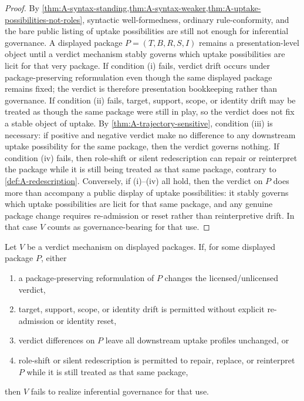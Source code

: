 \begin{proof}
By \cref{thm:A-syntax-standing,thm:A-syntax-weaker,thm:A-uptake-possibilities-not-roles}, syntactic well-formedness, ordinary rule-conformity, and the bare public listing of uptake possibilities are still not enough for inferential governance. A displayed package $P=(T,B,R,S,I)$ remains a presentation-level object until a verdict mechanism stably governs which uptake possibilities are licit for that very package. If condition (i) fails, verdict drift occurs under package-preserving reformulation even though the same displayed package remains fixed; the verdict is therefore presentation bookkeeping rather than governance. If condition (ii) fails, target, support, scope, or identity drift may be treated as though the same package were still in play, so the verdict does not fix a stable object of uptake. By \cref{thm:A-trajectory-sensitive}, condition (iii) is necessary: if positive and negative verdict make no difference to any downstream uptake possibility for the same package, then the verdict governs nothing. If condition (iv) fails, then role-shift or silent redescription can repair or reinterpret the package while it is still being treated as that same package, contrary to \cref{def:A-redescription}. Conversely, if (i)--(iv) all hold, then the verdict on $P$ does more than accompany a public display of uptake possibilities: it stably governs which uptake possibilities are licit for that same package, and any genuine package change requires re-admission or reset rather than reinterpretive drift. In that case $V$ counts as governance-bearing for that use.
\end{proof}


\begin{theorem}
\label{thm:A-drift-failure}
Let $V$ be a verdict mechanism on displayed packages. If, for some displayed package $P$, either
\begin{enumerate}[label=(\roman*), leftmargin=2.5em]
    \item a package-preserving reformulation of $P$ changes the licensed/unlicensed verdict,
    \item target, support, scope, or identity drift is permitted without explicit re-admission or identity reset,
    \item verdict differences on $P$ leave all downstream uptake profiles unchanged, or
    \item role-shift or silent redescription is permitted to repair, replace, or reinterpret $P$ while it is still treated as that same package,
\end{enumerate}
then $V$ fails to realize inferential governance for that use.
\end{theorem}

